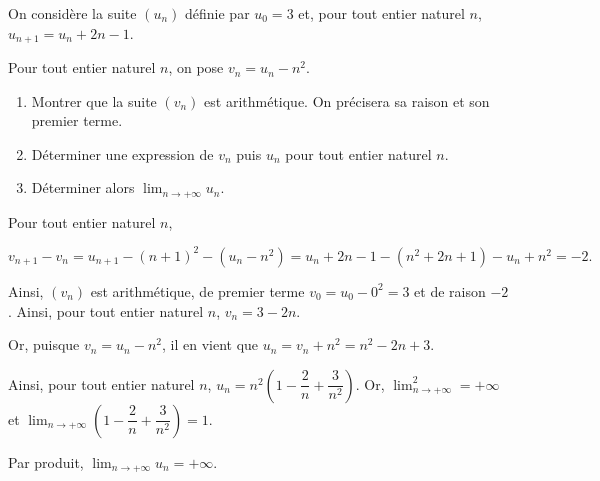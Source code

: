 \documentclass[11pt,fleqn]{book} %
\begin{document}
\begin{exercise}[topic=lim02]On considère la suite $(u_n)$ définie par $u_0=3$ et, pour tout entier naturel $n$, $u_{n+1}=u_n+2n-1$.

Pour tout entier naturel $n$, on pose $v_n=u_n-n^2$.
\begin{enumerate}
\item Montrer que la suite $(v_n)$ est arithmétique. On précisera sa raison et son premier terme.
\item Déterminer une expression de $v_n$ puis $u_n$ pour tout entier naturel $n$.
\item Déterminer alors $\displaystyle\lim_{n \to +\infty}u_n$.
\end{enumerate}\end{exercise}
\begin{solution}

Pour tout entier naturel $n$, 

\[v_{n+1}-v_n = u_{n+1}-(n+1)^2-(u_n-n^2)=u_n+2n-1-(n^2+2n+1)-u_n+n^2=-2.\]

Ainsi, $(v_n)$ est arithmétique, de premier terme $v_0=u_0-0^2=3$ et de raison $-2$. Ainsi, pour tout entier naturel $n$, $v_n=3-2n$.

Or, puisque $v_n=u_n-n^2$, il en vient que $u_n=v_n+n^2=n^2-2n+3$.

Ainsi, pour tout entier naturel $n$, $u_n = n^2 \left(1-\dfrac{2}{n}+\dfrac{3}{n^2}\right)$. Or, $\displaystyle\lim_{n \to +\infty}^2=+\infty$ et  $\displaystyle\lim_{n \to +\infty}\left(1-\dfrac{2}{n}+\dfrac{3}{n^2}\right)=1$. 

Par produit, $\displaystyle\lim_{n \to +\infty}u_n=+\infty$.\end{solution}
\end{document}
